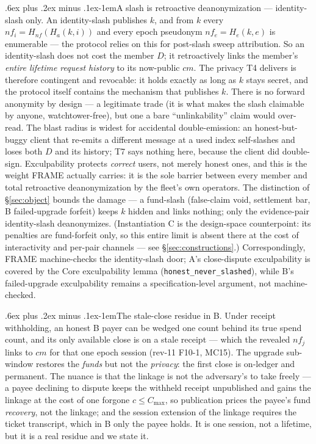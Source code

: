 \documentclass[9pt]{extarticle}
\makeatletter
\renewcommand\paragraph{\@startsection{paragraph}{4}{0pt}%
  {.6ex plus .2ex minus .1ex}{-1em}{\normalfont\normalsize\bfseries}}
\newcommand{\decl}[1]{\nolinkurl{#1}}
\makeatother
\begin{document}
\paragraph{A slash is retroactive deanonymization --- identity-slash only.}
An identity-slash publishes $k$, and from $k$ every $nf_i = H_{nf}(H_a(k,
i))$ and every epoch pseudonym $nf_e = H_e(k, e)$ is enumerable --- the
protocol relies on this for post-slash sweep attribution. So an
identity-slash does not cost the member $D$; it retroactively links the
member's \emph{entire lifetime request history} to its now-public $cm$. The
privacy T4 delivers is therefore contingent and revocable: it holds exactly
as long as $k$ stays secret, and the protocol itself contains the mechanism
that publishes $k$. There is no forward anonymity by design --- a legitimate
trade (it is what makes the slash claimable by anyone, watchtower-free), but
one a bare ``unlinkability'' claim would over-read. The blast radius is
widest for accidental double-emission: an honest-but-buggy client that
re-emits a different message at a used index self-slashes and loses both $D$
and its history; T7 says nothing here, because the client did double-sign.
Exculpability protects \emph{correct} users, not merely honest ones, and
this is the weight FRAME actually carries: it is the sole barrier between
every member and total retroactive deanonymization by the fleet's own
operators. The distinction of \S\ref{sec:object} bounds the damage --- a
fund-slash (false-claim void, settlement bar, B failed-upgrade forfeit)
keeps $k$ hidden and links nothing; only the evidence-pair identity-slash
deanonymizes. (Instantiation C is the design-space counterpoint: its
penalties are fund-forfeit only, so this entire limit is absent there at
the cost of interactivity and per-pair channels --- see
\S\ref{sec:constructions}.) Correspondingly, FRAME machine-checks the identity-slash door;
A's close-dispute exculpability is covered by the Core exculpability lemma
(\decl{honest_never_slashed}), while B's failed-upgrade exculpability
remains a specification-level argument, not machine-checked.

\paragraph{The stale-close residue in B.} Under receipt withholding, an
honest B payer can be wedged one count behind its true spend count, and its
only available close is on a stale receipt --- which the revealed $nf_j$
links to $cm$ for that one epoch session (rev-11 F10-1, MC15). The upgrade
sub-window restores the \emph{funds} but not the \emph{privacy}: the first
close is on-ledger and permanent. The nuance is that the linkage is not the
adversary's to take freely --- a payee declining to dispute keeps the
withheld receipt unpublished and gains the linkage at the cost of one
forgone $c \le C_{\max}$, so publication prices the payee's fund
\emph{recovery}, not the linkage; and the session extension of the linkage
requires the ticket transcript, which in B only the payee holds. It is one
session, not a lifetime, but it is a real residue and we state it.
\end{document}
